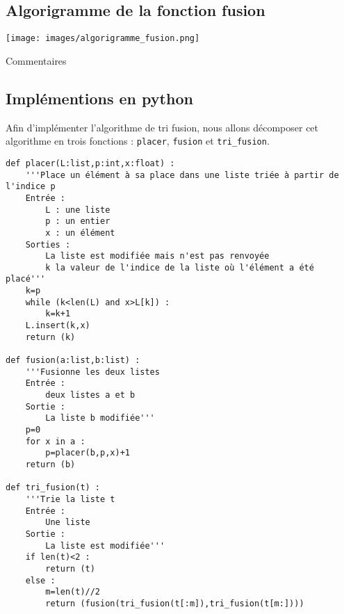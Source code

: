 \documentclass[t,11pt]{article}
\begin{document}
\subsection{Algorigramme de la fonction fusion}

\begin{minipage}{.5\textwidth}%
\begin{center}
\texttt{[image: images/algorigramme\_fusion.png]}
\end{center}
\end{minipage}%
\hfill
\begin{minipage}{.45\textwidth}%
\vspace*{0.6cm}
\begin{python}
Commentaires
\vspace*{13cm}
\end{python}
\end{minipage}


\newpage
\subsection{Implémentions en python}
\noindent
Afin d'implémenter l'algorithme de tri fusion, nous allons décomposer cet algorithme en trois fonctions : \texttt{placer}, \texttt{fusion} et \texttt{tri\_fusion}.

\begin{lstlisting}
def placer(L:list,p:int,x:float) :
    '''Place un élément à sa place dans une liste triée à partir de l'indice p
    Entrée :
        L : une liste
        p : un entier
        x : un élément
    Sorties :
        La liste est modifiée mais n'est pas renvoyée
        k la valeur de l'indice de la liste où l'élément a été placé'''
    k=p
    while (k<len(L) and x>L[k]) :
        k=k+1
    L.insert(k,x)
    return (k)

def fusion(a:list,b:list) :
    '''Fusionne les deux listes
    Entrée :
        deux listes a et b
    Sortie :
        La liste b modifiée'''
    p=0
    for x in a :
        p=placer(b,p,x)+1
    return (b)

def tri_fusion(t) :
    '''Trie la liste t
    Entrée :
        Une liste
    Sortie :
        La liste est modifiée'''
    if len(t)<2 :
        return (t)
    else :
        m=len(t)//2
        return (fusion(tri_fusion(t[:m]),tri_fusion(t[m:])))
\end{lstlisting}
\end{document}

